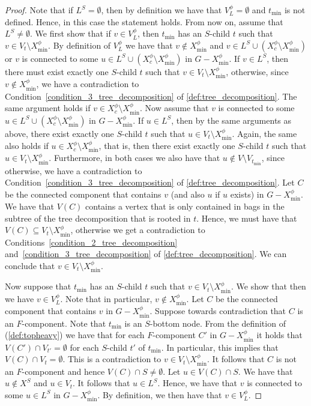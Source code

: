 \documentclass[a4paper,UKenglish,cleveref, autoref, thm-restate, numberwithinsect]{lipics-v2021}
\newcommand{\topheavy}{\text{top-heavy}\xspace}
\begin{document}
\begin{proof}
Note that if $L^S=\emptyset$, then by definition we have that $V^\phi_L=\emptyset$ and $t_{\min}$ is not defined. Hence, in this case the statement holds. From now on, assume that $L^S\neq\emptyset$.
We first show that if $v\in V^\phi_L$, then $t_{\min}$ has an $S$-child $t$ such that $v\in V_t\setminus X^\phi_{\min}$. By definition of $V^\phi_L$ we have that $v\notin X^\phi_{\min}$ and $v\in L^S\cup (X^\phi_c\setminus X^\phi_{\min})$ or $v$ is connected to some $u\in L^S\cup (X^\phi_c\setminus X^\phi_{\min})$ in $G-X^\phi_{\min}$.
If $v\in L^S$, then there must exist exactly one $S$-child $t$ such that $v\in V_t\setminus X^\phi_{\min}$, otherwise, since $v\notin X^\phi_{\min}$, we have a contradiction to Condition~\ref{condition_3_tree_decomposition} of \cref{def:tree_decomposition}. The same argument holds if $v\in X^\phi_c\setminus X^\phi_{\min}$.
Now assume that $v$ is connected to some $u\in L^S\cup (X^\phi_c\setminus X^\phi_{\min})$ in $G-X^\phi_{\min}$. If $u\in L^S$, then by the same arguments as above, there exist exactly one $S$-child $t$ such that $u\in V_t\setminus X^\phi_{\min}$. Again, the same also holds if $u\in X^\phi_c\setminus X^\phi_{\min}$, that is, then there exist exactly one $S$-child $t$ such that $u\in V_t\setminus X^\phi_{\min}$. Furthermore, in both cases we also have that $u\notin V\setminus V_{t_{\min}}$, since otherwise, we have a contradiction to Condition~\ref{condition_3_tree_decomposition} of \cref{def:tree_decomposition}.
Let $C$ be the connected component that contains $v$ (and also $u$ if $u$ exists) in $G-X^\phi_{\min}$. We have that $V(C)$ contains a vertex that is only contained in bags in the subtree of the tree decomposition that is rooted in $t$. Hence, we must have that $V(C)\subseteq V_t\setminus X^\phi_{\min}$, otherwise we get a contradiction to Conditions~\ref{condition_2_tree_decomposition} and~\ref{condition_3_tree_decomposition} of \cref{def:tree_decomposition}. We can conclude that $v\in V_t\setminus X^\phi_{\min}$.

Now suppose that $t_{\min}$ has an $S$-child $t$ such that $v\in V_t\setminus X^\phi_{\min}$. We show that then we have $v\in V^\phi_L$. Note that in particular, $v\notin X^\phi_{\min}$. Let $C$ be the connected component that contains $v$ in $G-X^\phi_{\min}$. Suppose towards contradiction that $C$ is an $F$-component. Note that $t_{\min}$ is an $S$-bottom node. From the definition of \topheavy{ness} (\cref{def:topheavy}) we have that for each $F$-component $C'$ in $G-X^\phi_{\min}$ it holds that $V(C')\cap V_{t'}=\emptyset$ for each $S$-child $t'$ of $t_{\min}$. In particular, this implies that $V(C)\cap V_t=\emptyset$. This is a contradiction to $v\in V_t\setminus X^\phi_{\min}$. It follows that $C$ is not an $F$-component and hence $V(C)\cap S\neq\emptyset$. Let $u\in V(C)\cap S$. We have that $u\notin X^S$ and $u\in V_t$. It follows that $u\in L^S$. Hence, we have that $v$ is connected to some $u\in L^S$ in $G-X^\phi_{\min}$. By definition, we then have that $v\in V^\phi_L$.
\end{proof}
\end{document}
